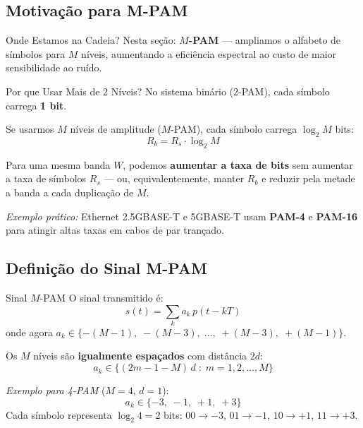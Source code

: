 
\subsection{Motivação para M-PAM}

\begin{frame}{Onde Estamos na Cadeia?}
  \vspace{0.1cm}
  {\small Nesta seção: \textbf{$M$-PAM} — ampliamos o alfabeto de
  símbolos para $M$ níveis, aumentando a eficiência espectral ao
  custo de maior sensibilidade ao ruído.}
\end{frame}

\begin{frame}{Por que Usar Mais de 2 Níveis?}
  No sistema binário (2-PAM), cada símbolo carrega \textbf{1 bit}.

  \vspace{0.3cm}
  Se usarmos $M$ níveis de amplitude (\alert{$M$-PAM}), cada símbolo
  carrega $\log_2 M$ bits:
  \[
    R_b = R_s \cdot \log_2 M
  \]

  \vspace{0.2cm}
  Para uma mesma banda $W$, podemos \textbf{aumentar a taxa de bits}
  sem aumentar a taxa de símbolos $R_s$ — ou, equivalentemente,
  manter $R_b$ e \alert{reduzir pela metade} a banda a cada
  duplicação de $M$.

  \vspace{0.3cm}
  \textit{Exemplo prático:} Ethernet 2.5GBASE-T e 5GBASE-T usam
  \textbf{PAM-4} e \textbf{PAM-16} para atingir altas taxas em
  cabos de par trançado.
\end{frame}

\subsection{Definição do Sinal M-PAM}

\begin{frame}{Sinal $M$-PAM}
  O sinal transmitido é:
  \[
    s(t) = \sum_{k} a_k\, p(t - kT)
  \]
  onde agora $a_k \in \{-(M-1),\; -(M-3),\; \ldots,\; +(M-3),\; +(M-1)\}$.

  \vspace{0.3cm}
  Os $M$ níveis são \textbf{igualmente espaçados} com distância $2d$:
  \[
    a_k \in \{(2m - 1 - M)\, d \;:\; m = 1, 2, \ldots, M\}
  \]

  \vspace{0.3cm}
  \textit{Exemplo para 4-PAM} ($M = 4$, $d = 1$):
  \[
    a_k \in \{-3,\; -1,\; +1,\; +3\}
  \]
  Cada símbolo representa $\log_2 4 = 2$ bits:
  $00 \to -3$, $01 \to -1$, $10 \to +1$, $11 \to +3$.
\end{frame}


